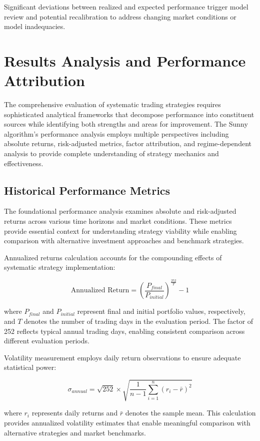 \documentclass[
  american,
  11pt,
  11pt,
  letterpaper,
  onecolumn]{article}
\begin{document}
Significant deviations between realized and expected performance trigger
model review and potential recalibration to address changing market
conditions or model inadequacies.

\section{Results Analysis and Performance
Attribution}\label{results-analysis-and-performance-attribution}

The comprehensive evaluation of systematic trading strategies requires
sophisticated analytical frameworks that decompose performance into
constituent sources while identifying both strengths and areas for
improvement. The Sunny algorithm's performance analysis employs multiple
perspectives including absolute returns, risk-adjusted metrics, factor
attribution, and regime-dependent analysis to provide complete
understanding of strategy mechanics and effectiveness.

\subsection{Historical Performance
Metrics}\label{historical-performance-metrics}

The foundational performance analysis examines absolute and
risk-adjusted returns across various time horizons and market
conditions. These metrics provide essential context for understanding
strategy viability while enabling comparison with alternative investment
approaches and benchmark strategies.

Annualized returns calculation accounts for the compounding effects of
systematic strategy implementation:

\[\text{Annualized Return} = \left(\frac{P_{final}}{P_{initial}}\right)^{\frac{252}{T}} - 1\]

where \(P_{final}\) and \(P_{initial}\) represent final and initial
portfolio values, respectively, and \(T\) denotes the number of trading
days in the evaluation period. The factor of 252 reflects typical annual
trading days, enabling consistent comparison across different evaluation
periods.

Volatility measurement employs daily return observations to ensure
adequate statistical power:

\[\sigma_{annual} = \sqrt{252} \times \sqrt{\frac{1}{n-1}\sum_{i=1}^{n}(r_i - \bar{r})^2}\]

where \(r_i\) represents daily returns and \(\bar{r}\) denotes the
sample mean. This calculation provides annualized volatility estimates
that enable meaningful comparison with alternative strategies and market
benchmarks.
\end{document}
